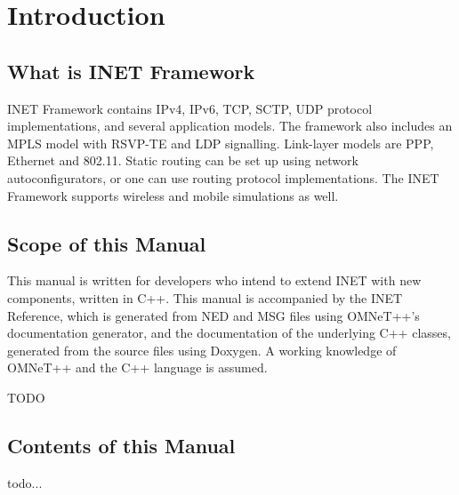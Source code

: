 \chapter{Introduction}
\label{cha:introduction}


\section{What is INET Framework}

INET Framework contains IPv4, IPv6, TCP, SCTP, UDP protocol implementations,
and several application models. The framework also includes an MPLS model
with RSVP-TE and LDP signalling. Link-layer models are PPP, Ethernet and 802.11.
Static routing can be set up using network autoconfigurators, or one can use
routing protocol implementations. The INET Framework supports wireless and
mobile simulations as well.


\section{Scope of this Manual}

This manual is written for developers who intend to extend INET with new
components, written in C++. This manual is accompanied by the INET Reference,
which is generated from NED and MSG files using OMNeT++'s documentation generator, 
and the documentation of the underlying C++ classes, generated from the source files 
using Doxygen. A working knowledge of OMNeT++ and the C++ language is assumed.

\ifdraft TODO
\section{Contents of this Manual}

todo...
\fi



